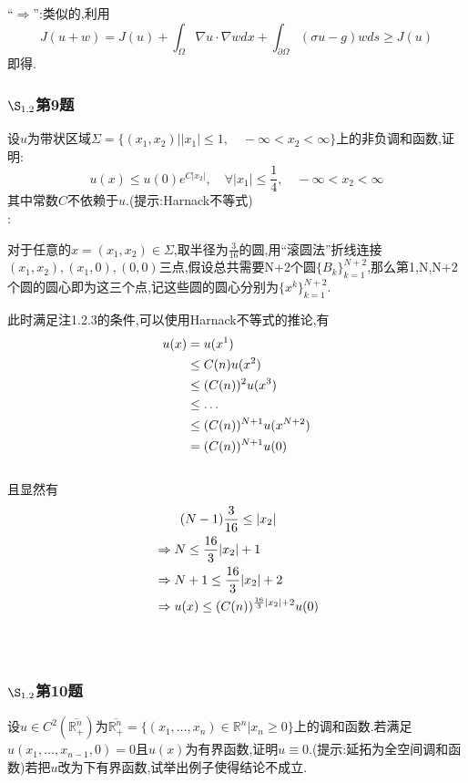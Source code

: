 \documentclass[12pt, a4paper]{article}
\begin{document}
    ``$\Rightarrow$'':类似的,利用$$J(u+w) = J(u) + \int_{\Omega} \nabla u \cdot \nabla w dx + \int_{\partial \Omega}(\sigma u -g )w ds \geq J(u)$$即得.

	\subsubsection{$\S_{1.2}$第9题}
	\kaishu{}
	设$u$为带状区域$\Sigma=\{(x_1,x_2)||x_1|\le 1, \quad -\infty<x_2< \infty\}$上的非负调和函数,证明:$$
	u(x)\le u(0)e^{C|x_2|},\quad \forall |x_1|\le \frac{1}{4},\quad -\infty<x_2< \infty		$$
	其中常数$C$不依赖于$u$.(提示:Harnack不等式)\\
	
	\songti{}
	:
	
	对于任意的$x=(x_1,x_2)\in \Sigma$,取半径为$\frac{3}{16}$的圆,用“滚圆法”折线连接$(x_1,x_2),(x_1,0),(0,0)$三点,假设总共需要N+2个圆$\{B_k\}_{k=1}^{N+2}$,那么第1,N,N+2个圆的圆心即为这三个点,记这些圆的圆心分别为$\{x^k\}_{k=1}^{N+2}$.
	
	
	此时满足注1.2.3的条件,可以使用Harnack不等式的推论,有
	\begin{align}
		u(x)&=u(x^1)\notag \\
		&\le C(n)u(x^2) \notag\\
		&\le (C(n))^2 u(x^3) \notag \\
		&\le \dots \notag \\
		&\le (C(n))^{N+1}u(x^{N+2}) \notag \\
		&= (C(n))^{N+1}u(0) \notag
	\end{align}\\
	且显然有
	\begin{align}
		&\qquad (N-1)\frac{3}{16} \le |x_2|	\notag \\
		&\Rightarrow N \le \frac{16}{3}|x_2| +1 \notag \\
		&\Rightarrow N+1 \le \frac{16}{3}|x_2| +2 \notag \\
		&\Rightarrow u(x) \le (C(n))^{\frac{16}{3}|x_2| +2}u(0) \notag 
	\end{align}\\
	{\color{red}{原题应当有误,右端还应该多一个常数.}}\\
	
	\subsubsection{$\S_{1.2}$第10题}
	\kaishu{}
	设$u \in C^2(\overline{\mathbb{R}_{+}^{n}})$为$\overline{\mathbb{R}_{+}^n}=\{(x_1,\dots,x_n)\in \mathbb{R}^n|x_n \ge 0\}$上的调和函数.若满足$u(x_1,\dots,x_{n-1},0)=0$且$u(x)$为有界函数,证明$u\equiv 0$.(提示:延拓为全空间调和函数)若把$u$改为下有界函数,试举出例子使得结论不成立.\\
	
\end{document}
